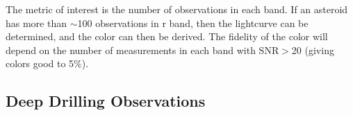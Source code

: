 %

%

The metric of interest is the number of observations in each band. If an
asteroid has more than $\sim$100 observations in r band, then the
lightcurve can be determined, and the color can then be derived. The
fidelity of the color will depend on the number of measurements in each
band with SNR$>$20 (giving colors good to 5\%).

%
%
%
%
%
%

%
%
%
%

\subsection{Deep Drilling Observations}

